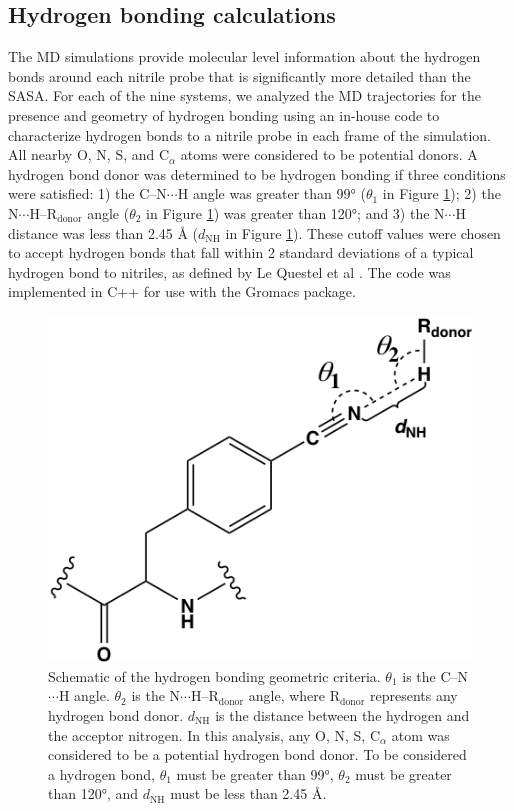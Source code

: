 \subsection{Hydrogen bonding calculations}

The MD simulations provide molecular level information about the hydrogen bonds around each nitrile probe that is significantly more detailed than the SASA.
For each of the nine systems, we analyzed the MD trajectories for the presence and geometry of hydrogen bonding using an in-house code to characterize hydrogen bonds to a nitrile probe in each frame of the simulation.
All nearby O, N, S, and C$_{\alpha}$ atoms were considered to be potential donors.
A hydrogen bond donor was determined to be hydrogen bonding if three conditions were satisfied: 1) the C--N$\cdots$H angle was greater than \ang{99} ($\theta_1$ in Figure \ref{fig:hbond-scheme}); 2) the N$\cdots$H--R$_{\text{donor}}$ angle ($\theta_2$ in Figure \ref{fig:hbond-scheme}) was greater than \ang{120}; and 3) the N$\cdots$H distance was less than 2.45 \si{\angstrom} ($d_{\text{NH}}$ in Figure \ref{fig:hbond-scheme}).
These cutoff values were chosen to accept hydrogen bonds that fall within 2 standard deviations of a typical hydrogen bond to nitriles, as defined by Le Questel et al \cite{LeQuestel2000}.
The code was implemented in C++ for use with the Gromacs package.  

\begin{figure}
    \center
    \includegraphics[width=\single]{figures-gfp-hbond/hbonding_scheme.png}
    \caption{
        Schematic of the hydrogen bonding geometric criteria. 
        $\theta_1$ is the C--N$\cdots$H angle. 
        $\theta_2$ is the N$\cdots$H--R$_{\text{donor}}$ angle, where R$_{\text{donor}}$ represents any hydrogen bond donor. 
        $d_{\text{NH}}$ is the distance between the hydrogen and the acceptor nitrogen. 
        In this analysis, any O, N, S, C$_{\alpha}$ atom was considered to be a potential hydrogen bond donor. 
        To be considered a hydrogen bond, $\theta_1$ must be greater than \ang{99}, $\theta_2$ must be greater than \ang{120}, and $d_{\text{NH}}$ must be less than 2.45 \si{\angstrom}.
    }
    \label{fig:hbond-scheme}
\end{figure}


